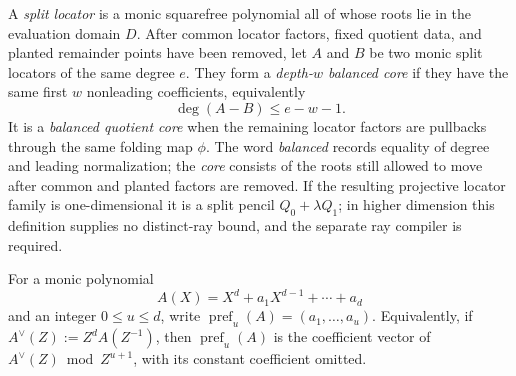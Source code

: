 \documentclass[11pt,a4paper]{amsart}
\numberwithin{equation}{section}
\theoremstyle{remark}
\begin{document}
\begin{definition}
\label{def:balanced-quotient-core}
A \emph{split locator} is a monic squarefree polynomial all of whose roots
lie in the evaluation domain \(D\).
After common locator factors, fixed quotient data, and planted remainder
points have been removed, let \(A\) and \(B\) be two monic split
locators of the same degree \(e\).  They form a
\emph{depth-\(w\) balanced core} if they have the same first \(w\)
nonleading coefficients, equivalently
\[
                         \deg(A-B)\le e-w-1.
\]
It is a \emph{balanced quotient core} when the remaining locator factors
are pullbacks through the same folding map \(\phi\).  The word
\emph{balanced} records equality of degree and leading normalization;
the \emph{core} consists of the roots still allowed to move after common
and planted factors are removed.  If the resulting projective locator
family is one-dimensional it is a split pencil
\(Q_0+\lambda Q_1\); in higher dimension this definition supplies no
distinct-ray bound, and the separate ray compiler is required.
\end{definition}

For a monic polynomial
\[
 A(X)=X^d+a_1X^{d-1}+\cdots+a_d
\]
and an integer $0\le u\le d$, write
\(\operatorname{pref}_u(A)=(a_1,\ldots,a_u)\).  Equivalently, if
\(A^\vee(Z):=Z^dA(Z^{-1})\), then
\(\operatorname{pref}_u(A)\) is the coefficient vector of
\(A^\vee(Z)\bmod Z^{u+1}\), with its constant coefficient omitted.
\end{document}
